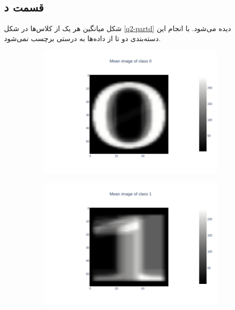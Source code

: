\documentclass{article}
\begin{document}
\subsection*{قسمت د}

شکل میانگین هر یک از کلاس‌ها در شکل \ref{q2-partd} دیده می‌شود. با انجام این دسته‌بندی
دو تا از داده‌ها به درستی برچسب نمی‌شود.


\begin{figure}[h]
    \begin{subfigure}{.3\linewidth}
        \centering
        \includegraphics[width=\linewidth]{images/q2/partd/0_prototype.png}
    \end{subfigure}
    \hfill
    \begin{subfigure}{.3\linewidth}
        \centering
        \includegraphics[width=\linewidth]{images/q2/partd/1_prototype.png}

\end{subfigure}
\end{figure}
\end{document}
